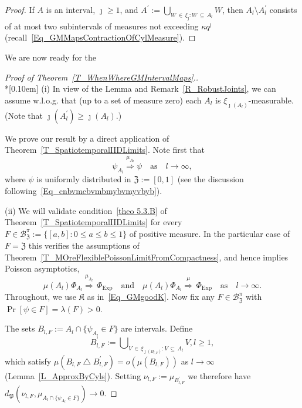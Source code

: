 \documentclass[AHL,Unicode,longabstracts]{cedram}
\newcommand{\clB}{\mathcal{B}}
\newcommand{\Expl}{\mathrm{Exp}}
\newcommand{\frkK}{\mathfrak{K}}
\newcommand{\frkP}{\mathfrak{P}}
\newcommand{\frkZ}{\mathfrak{Z}}
\begin{document}
\begin{proof}
If $A$ is an interval, $\jmath\geq1$, and $A^{\prime}:= {\textstyle\bigcup\nolimits_{W\,\in\,\xi_{\jmath}:W\,\subseteq\,A_{l}}} W$, then $A_{l}\setminus A_{l}^{\prime}$ consists of at most two subintervals of measures not exceeding $\kappa q^{\jmath}$ (recall~\eqref{Eq_GMMapsContractionOfCylMeasure}).
\end{proof}

We are now ready for the

\begin{proof}[{Proof of Theorem~\ref{T_WhenWhereGMIntervalMaps}.}]\ \\*[0.10em]
\noindent(i) In view of the Lemma and Remark~\ref{R_RobustJoints}, we can assume w.l.o.g. that (up to a set of measure zero) each $A_{l}$ is $\xi_{\jmath(A_{l})} $-measurable. (Note that $\jmath(A_{l}^{\prime})\geq\jmath(A_{l})$.)

We prove our result by a direct application of Theorem~\ref{T_SpatiotemporalIIDLimits}. Note first that
\begin{equation}
\psi_{A_{l}}\overset{\mu_{A_{l}}}{\Longrightarrow}\psi\quad\text{as}\quad l\rightarrow\infty,
\end{equation}
where $\psi$ is uniformly distributed in $\frkZ:=[0,1]$ (see the discussion following~\eqref{Eq_cnbvmcbvmbmybvmyvbyb}).

\vspace{6pt}
\noindent(ii) We will validate condition~\eqref{theo 5.3.B} of Theorem~\ref{T_SpatiotemporalIIDLimits} for every $F\in\clB_{\frkZ} ^{\pi}:=\{[a,b]:0\leq a\leq b\leq1\}$ of positive measure. In the particular case of $F=\frkZ$ this verifies the assumptions of Theorem~\ref{T_MOreFlexiblePoissonLimitFromCompactness}, and hence implies Poisson asymptotics,
\begin{equation}\label{Eq_PoiAsy}
\mu(A_{l})\Phi_{A_{l}}\overset{\mu_{A_{l}}}{\Longrightarrow}\,\Phi _{\Expl} \quad \text{and}\quad\mu(A_{l})\Phi_{A_{l}}\overset{\mu }{\Longrightarrow}\,\Phi_{\Expl}\quad \text{as}\quad l\rightarrow
\infty\text{.} 
\end{equation}
Throughout, we use $\frkK$ as in~\eqref{Eq_GMgoodK}. Now fix any $F\in\clB_{\frkZ}^{\pi}$ with $\Pr[\psi\in F]=\lambda(F)>0$.

The sets $B_{l,F}:=A_{l}\cap\{\psi_{A_{l}}\in F\}$ are intervals. Define 
\[
B_{l,F}^{\prime}:= {\textstyle\bigcup\nolimits_{V\,\in\,\xi_{\jmath(B_{l,F})}:V\,\subseteq\,A_{l}}} V, l\geq1,
\]
which satisfy $\mu(B_{l,F}\bigtriangleup B_{l,F}^{\prime})=o(\mu(B_{l,F}))$ as $l\rightarrow\infty$ (Lemma~\ref{L_ApproxByCyls}). Setting $\nu_{l,F}:=\mu_{B_{l,F}^{\prime}}$ we therefore have $d_{\frkP }(\nu_{l,F},\mu_{A_{l}\cap\{\psi_{A_{l}}\in F\}})\rightarrow0$.


\end{proof}
\end{document}
